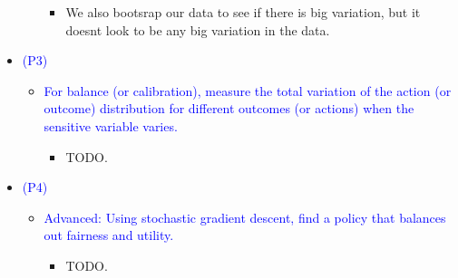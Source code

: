 \documentclass[a4paper, 12pt]{extarticle}
\begin{document}
\begin{itemize}
\begin{itemize}
\begin{itemize}
                \item We also bootsrap our data to see if there is big variation, but it doesnt look to be any big variation in the data.
            \end{itemize}
        \end{itemize}
    \item \textcolor{blue}{(P3)}
        \begin{itemize}
            \item \textcolor{blue}{For balance (or calibration), measure the total variation of the action (or outcome) distribution for different outcomes (or actions) when the sensitive variable varies.}
            \begin{itemize}
                \item TODO.
            \end{itemize}
        \end{itemize}
    \item \textcolor{blue}{(P4)}
        \begin{itemize}
            \item \textcolor{blue}{Advanced: Using stochastic gradient descent, find a policy that balances out fairness and utility.}
            \begin{itemize}
                \item TODO.
            \end{itemize}
        \end{itemize}
\end{itemize}

\newpage
\end{document}
